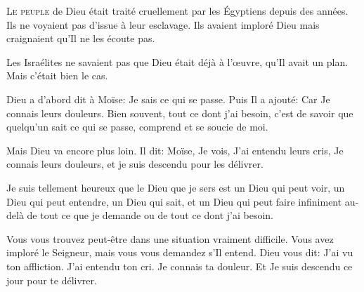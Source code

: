 



\lettrine{L}{e peuple} de Dieu était traité cruellement
 par les Égyptiens depuis des années.
 Ils ne voyaient pas d'issue à leur esclavage.
 Ils avaient imploré Dieu mais craignaient qu'Il ne les écoute pas.


Les Israélites ne savaient pas que Dieu était déjà à l'\oe{}uvre,
 qu'Il avait un plan. Mais c'était bien le cas.

Dieu a d'abord dit à Moïse: \Og Je sais ce qui se passe. \Fg{}
 Puis Il a ajouté: \Og Car Je connais leurs douleurs. \Fg{}
 Bien souvent, tout ce dont j'ai besoin,
 c'est de savoir que quelqu'un sait ce qui se passe,
 comprend et se soucie de moi.

Mais Dieu va encore plus loin. Il dit:
 \Og Moïse, Je vois, J'ai entendu leurs cris, Je connais leurs douleurs,
 et je suis descendu pour les délivrer. \Fg{}

Je suis tellement heureux que le Dieu que je sers est un Dieu qui peut voir,
 un Dieu qui peut entendre, un Dieu qui sait,
 et un Dieu qui peut faire infiniment au-delà
 de tout ce que je demande ou de tout ce dont j'ai besoin.

Vous vous trouvez peut-être dans une situation vraiment difficile.
 Vous avez imploré le Seigneur, mais vous vous demandez s'Il entend.
 Dieu vous dit:
 \Og J'ai vu ton affliction. J'ai entendu ton cri. Je connais ta douleur.
 Et Je suis descendu ce jour pour te délivrer. \Fg{}

\dvrule




